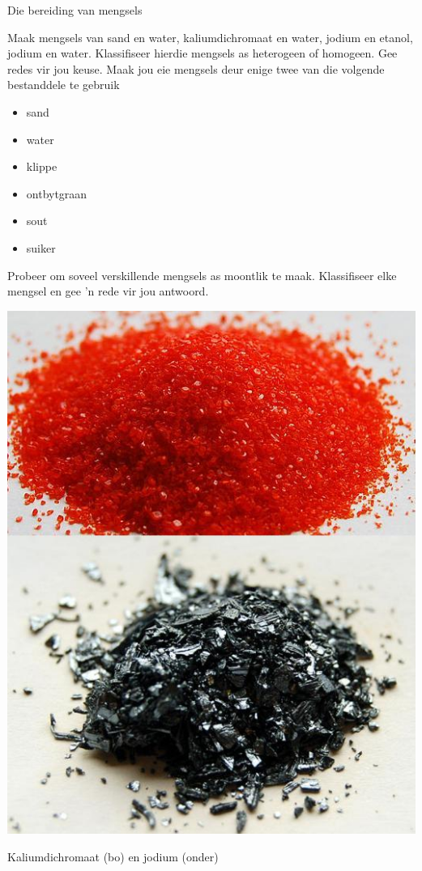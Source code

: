 \vspace{-1cm}
\begin{activity}{Die bereiding van mengsels}
{
\begin{minipage}{0.6\textwidth}
Maak mengsels van sand en water, kaliumdichromaat en water, jodium en etanol, jodium en water. Klassifiseer hierdie mengsels as heterogeen of homogeen. Gee redes vir jou keuse. Maak jou eie mengsels deur enige twee van die volgende bestanddele te gebruik \begin{itemize}[noitemsep] \item sand \item water \item klippe \item ontbytgraan \item sout \item suiker \end{itemize}Probeer om soveel verskillende mengsels as moontlik te maak. Klassifiseer elke mengsel en gee 'n rede vir jou antwoord.                                                                                                                                                                                                                                                                                                                                                                                                                       
\end{minipage}
\begin{minipage}{.4\textwidth}
{
\begin{center}
 \includegraphics[width=.7\textwidth]{photos/iodine-KCr2O7-wikipedia.jpg}\par
\begin{caption}Kaliumdichromaat (bo) en jodium (onder)\end{caption}
\end{center}
}

\end{minipage}
}
\end{activity}
